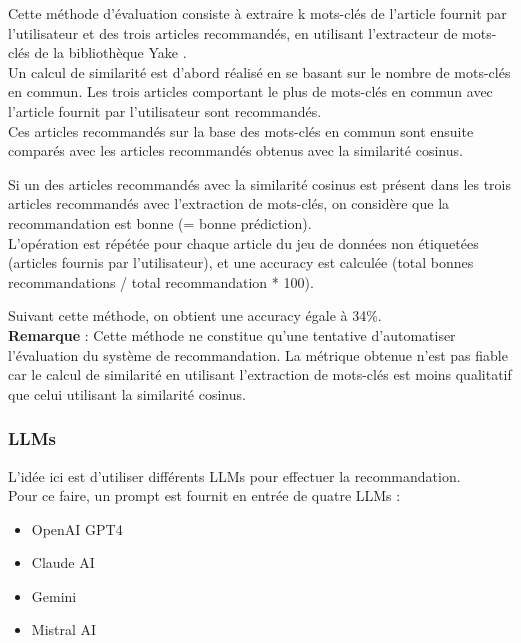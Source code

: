 \documentclass[a4paper,12pt]{article}
\begin{document}
Cette méthode d'évaluation consiste à extraire k mots-clés de l'article fournit par l'utilisateur et des trois articles recommandés, en utilisant l'extracteur de mots-clés de la bibliothèque Yake \cite{yake}.\\

Un calcul de similarité est d'abord réalisé en se basant sur le nombre de mots-clés en commun. Les trois articles comportant le plus de mots-clés en commun avec l'article fournit par l'utilisateur sont recommandés.\\

Ces articles recommandés sur la base des mots-clés en commun sont ensuite comparés avec les articles recommandés obtenus avec la similarité cosinus.

Si un des articles recommandés avec la similarité cosinus est présent dans les trois articles recommandés avec l'extraction de mots-clés, on considère que la recommandation est bonne (= bonne prédiction).\\

L'opération est répétée pour chaque article du jeu de données non étiquetées (articles fournis par l'utilisateur), et une accuracy est calculée (total bonnes recommandations / total recommandation * 100).

Suivant cette méthode, on obtient une accuracy égale à 34\%.\\

\textbf{Remarque} : Cette méthode ne constitue qu'une tentative d'automatiser l'évaluation du système de recommandation. La métrique obtenue n'est pas fiable car le calcul de similarité en utilisant l'extraction de mots-clés est moins qualitatif que celui utilisant la similarité cosinus.


\subsubsection{LLMs}

L'idée ici est d'utiliser différents LLMs pour effectuer la recommandation.\\

Pour ce faire, un prompt est fournit en entrée de quatre LLMs :
\begin{itemize}
    \item OpenAI GPT4
    \item Claude AI
    \item Gemini
    \item Mistral AI
\end{itemize}
\end{document}
